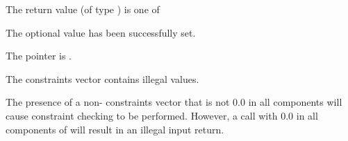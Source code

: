 {{\begin{args}
\begin{itemize}
    \end{itemize}
  \end{args}
}
{
  The return value  (of type ) is one of
  \begin{args}
  \item[\Id{IDA\_SUCCESS}] 
    The optional value has been successfully set.
  \item[\Id{IDA\_MEM\_NULL}]
    The  pointer is .
  \item[\Id{IDA\_ILL\_INPUT}]
    The constraints vector contains illegal values.
  \end{args}
}
{
  The presence of a non- constraints vector that is not $0.0$ in
  all components will cause constraint checking to be performed.
  However, a call with $0.0$ in all components of  will 
  result in an illegal input return.
}

}

